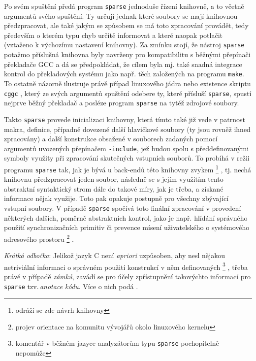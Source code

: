 Po svém spuštění předá program \texttt{sparse} jednoduše řízení knihovně, a to
včetně argumentů svého spuštění. Ty určují jednak které soubory se mají knihovnou
předzpracovat, ale také jakým se způsobem se má toto zpracování provádět, tedy
především o kterém typu chyb určitě informovat a které naopak potlačit
(vztaženo k výchozímu nastavení knihovny). Za zmínku
stojí, že nástroj \texttt{sparse} potažmo příslušná knihovna byly navrženy pro
kompatibilitu s běžnými přepínači překladače GCC a dá se předpokládat,
že cílem byla mj. také snadná integrace kontrol do překladových systému jako
např. těch založených na programu \texttt{make}. To ostatně názorně ilustruje
právě případ linuxového jádra \cite{web:MjmWired:SparseTxt} nebo existence
skriptu \texttt{cggc} \cite{manual:cgcc}, který ze svých argumentů spuštění odebere ty,
které přísluší \texttt{sparse}, spustí nejprve běžný překladač a posléze
program \texttt{sparse} na tytéž zdrojové soubory.

Takto \texttt{sparse} provede inicializaci knihovny, která tímto také již vede
v patrnost makra, definice, případně dovezené další hlavičkové soubory (ty jsou
rovněž ihned zpracovány) a další konstrukce obsažené v souborech zadaných pomocí
argumentů uvozených přepínačem \texttt{-include}, jež budou spolu s předdefinovanými
symboly využity při zpracování skutečných vstupních souborů.
To probíhá v režii programu \texttt{sparse} tak, jak je bývá u back-endů
této knihovny zvykem%
%
\footnote{odráží se zde návrh knihovny}%
%
, tj. nechá knihovnu předzpracovat jeden soubor,
následně se s jejím využitím tento abstraktní syntaktický strom dále 
do takové míry, jak je třeba, a získané informace nějak využije.
Toto pak opakuje postupně pro všechny zbývající vstupní soubory.
V případě \texttt{sparse} spočívá toto finální zpracování v provedení některých dalších,
poměrně abstraktních kontrol, jako je např. hlídání správného použití
synchronizačních primitiv či prevence mísení uživatelského
o systémového adresového prostoru%
%
\footnote{projev orientace na komunitu vývojářů okolo linuxového
kernelu}%
%
.

\noindent
\emph{Krátká odbočka}: Jelikož jazyk C není \textit{apriori} uzpůsoben, aby nesl nějakou
netriviální informaci o správném použití konstrukcí v něm definovaných%
%
\footnote{komentář v běžném jazyce analyzátorům typu \texttt{sparse} pochopitelně
nepomůže}%
%
, třeba právě v případě \emph{zámků}, zavádí se pro účely zpřístupnění
takovýchto informací pro \texttt{sparse} tzv.\,\emph{anotace kódu}. Více o nich
podá \cite{web:FITVUTBR:MartinNagy:StaticAnalysis}.

